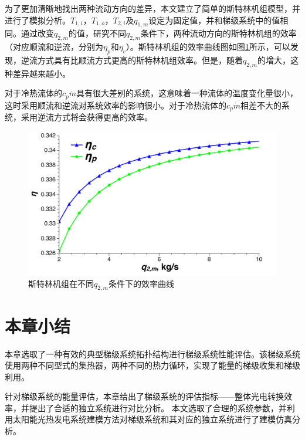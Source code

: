 为了更加清晰地找出两种流动方向的差异，本文建立了简单的斯特林机组模型，并进行了模拟分析。$T_{1,i}，T_{1,o}，T_{2,i}及q_{1,m}$设定为固定值，并和梯级系统中的值相同。通过改变$q_{2,m}$的值，研究不同$q_{2,m}$条件下，两种流动方向的斯特林机组的效率（对应顺流和逆流，分别为$\eta_p$和$\eta_c$）。斯特林机组的效率曲线图如图\ref{fig:SEAflowtypes}所示，可以发现，逆流方式具有比顺流方式更高的斯特林机组效率。但是，随着$q_{2,m}$的增大，这种差异越来越小。


对于冷热流体的$c_p\dot{m}$具有很大差别的系统，这意味着一种流体的温度变化量很小，这时采用顺流和逆流对系统效率的影响很小。对于冷热流体的$c_p\dot{m}$相差不大的系统，采用逆流方式将会获得更高的效率。

\noindent \begin{figure}[H]
\begin{center}
	\includegraphics[width = 0.8\columnwidth, angle = 0]{fig/SEAflowtypes}
	\caption{斯特林机组在不同$q_{2,m}$条件下的效率曲线}
	\label{fig:SEAflowtypes}
\end{center}
\end{figure}

\section{本章小结}

本章选取了一种有效的典型梯级系统拓扑结构进行梯级系统性能评估。该梯级系统使用两种不同型式的集热器，两种不同的热力循环，实现了能量的梯级收集和梯级利用。

针对梯级系统的能量评估，本章给出了梯级系统的评估指标——整体光电转换效率，并提出了合适的独立系统进行对比分析。
本文选取了合理的系统参数，并利用太阳能光热发电系统建模方法对梯级系统和其对应的独立系统进行了建模仿真分析。

